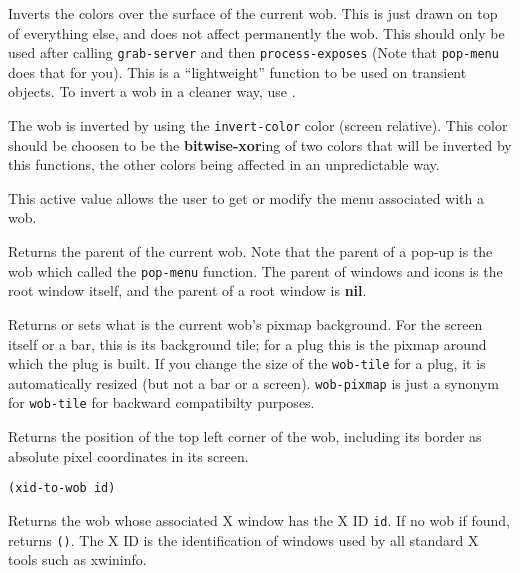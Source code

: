 Inverts the colors over the surface of the
current wob. This is just drawn on top of everything
else, and does not affect permanently the wob. This should only be used after
calling \verb"grab-server" and then \verb"process-exposes"
(Note that \verb"pop-menu" does that for you).
This is a ``lightweight'' function to be used on transient objects.
To invert a wob in a cleaner way, use .

The wob is inverted by using the \verb"invert-color" color (screen relative).
This color should be choosen to be the {\bf bitwise-xor}ing of two colors
that will be inverted by this functions, the other colors being affected
in an unpredictable way.

        

This active value allows the user to get or 
modify the menu associated with a wob.

        

Returns the parent of the current wob.  Note that the parent of a pop-up is
the wob which called the \verb"pop-menu" function. The parent of windows and
icons is the root window itself, and the parent of a root window is {\bf nil}.

        

Returns or sets what is the current wob's pixmap background. For the screen
itself or a bar, this is its background tile; for a plug this is
the pixmap around which the plug is built. If you change the size of the
\verb"wob-tile" for a plug, it is automatically resized (but not a bar
or a screen). \verb"wob-pixmap" is just a synonym for \verb"wob-tile"
for backward compatibilty purposes.



Returns the position of the top left corner of the wob, including its border
as absolute pixel coordinates in its screen.

        
{\usagefont\begin{verbatim}
(xid-to-wob id)
\end{verbatim}}\usageupspace

Returns the wob whose associated X window has the X ID \verb|id|. If no wob if
found, returns \verb|()|. The X ID is the identification of windows used by
all standard X tools such as {\sc xwininfo}.
